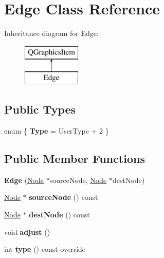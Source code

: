 \hypertarget{class_edge}{}\section{Edge Class Reference}
\label{class_edge}
Inheritance diagram for Edge\+:\begin{figure}[H]
\begin{center}
\leavevmode
\includegraphics[height=2.000000cm]{class_edge}
\end{center}
\end{figure}
\subsection*{Public Types}
\begin{DoxyCompactItemize}
\item 
\mbox{\label{class_edge_a06fc87d81c62e9abb8790b6e5713c55b}} 
enum \{ {\bfseries Type} = User\+Type + 2
 \}
\end{DoxyCompactItemize}
\subsection*{Public Member Functions}
\begin{DoxyCompactItemize}
\item 
\mbox{\label{class_edge_acbd2260a74dc7a92997264bb9d590bef}} 
{\bfseries Edge} (\mbox{\hyperlink{class_node}{Node}} $\ast$source\+Node, \mbox{\hyperlink{class_node}{Node}} $\ast$dest\+Node)
\item 
\mbox{\label{class_edge_a2cbf42b11b49e8a355841f21c511ca73}} 
\mbox{\hyperlink{class_node}{Node}} $\ast$ {\bfseries source\+Node} () const
\item 
\mbox{\label{class_edge_a18424e5abac7f0136537134f30dde305}} 
\mbox{\hyperlink{class_node}{Node}} $\ast$ {\bfseries dest\+Node} () const
\item 
\mbox{\label{class_edge_a70c18eca95b2b0ba60c4b8368867216c}} 
void {\bfseries adjust} ()
\item 
\mbox{\label{class_edge_a3fdff8834447e56a9f3f6e9fe5cc8b97}} 
int {\bfseries type} () const override
\end{DoxyCompactItemize}
